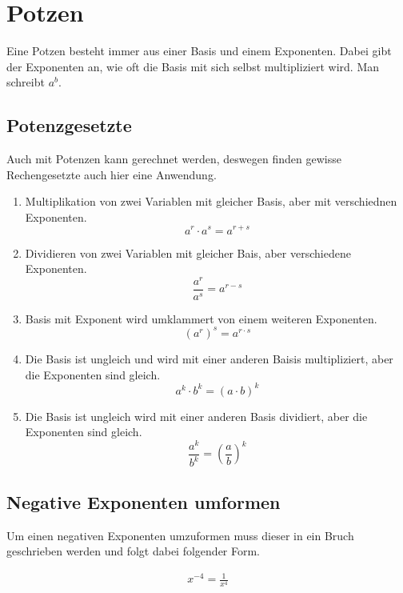 \pagebreak
\section{Potzen}\label{sec:Potenzen}
Eine Potzen besteht immer aus einer Basis und einem Exponenten. Dabei gibt der Exponenten an, wie oft die Basis mit sich selbst multipliziert wird. Man schreibt $a^b$. 
\subsection{Potenzgesetzte}\label{sec:Potenzen/Potenzgesetze}
 Auch mit Potenzen kann gerechnet werden, deswegen finden gewisse Rechengesetzte auch hier eine Anwendung.
\begin{enumerate}
	\item Multiplikation von zwei Variablen mit gleicher Basis, aber mit verschiednen Exponenten. \[a^r\cdot a^s=a^{r+s}\]
	\item Dividieren von zwei Variablen mit gleicher Bais, aber verschiedene Exponenten. \[\frac{a^r}{a^s}=a^{r-s}\]
	\item Basis mit Exponent wird umklammert von einem weiteren Exponenten. \[(a^r)^s=a^{r\cdot s}\]
	\item Die Basis ist ungleich und wird mit einer anderen Baisis multipliziert, aber die Exponenten sind gleich.\[a^k \cdot b^k =(a\cdot b)^k\]
	\item Die Basis ist ungleich wird mit einer anderen Basis dividiert, aber die Exponenten sind gleich. \[\frac{a^k}{b^k}=\left(\frac{a}{b}\right)^k\]
\end{enumerate}
\subsection{Negative Exponenten umformen}\label{sec:Potenzen/Negative Exponenten umformen}
Um einen negativen Exponenten umzuformen muss dieser in ein Bruch geschrieben werden und folgt dabei folgender Form. 

\begin{beispiel}
\begin{align*}
	x^{-4}=\frac{1}{x^4}
\end{align*}
\end{beispiel}
